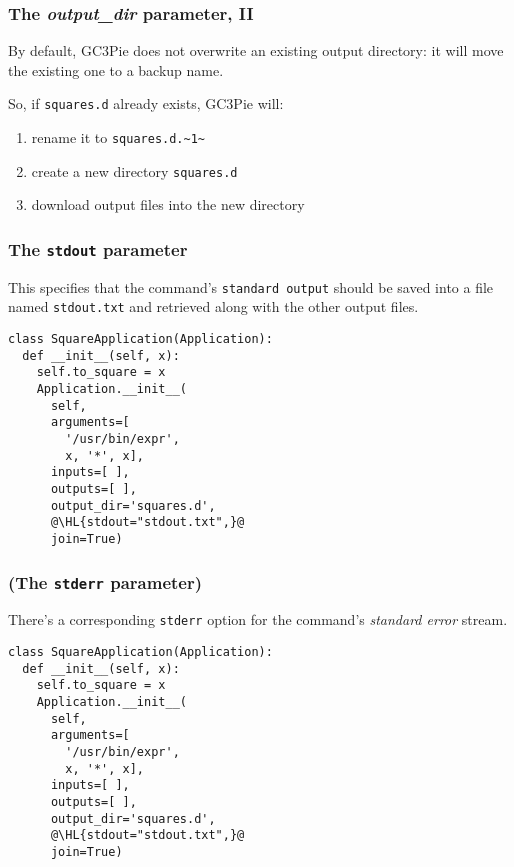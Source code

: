 \documentclass[english,serif,mathserif,xcolor=pdftex,dvipsnames,table]{beamer}
\begin{document}
\begin{frame}[fragile]
  \frametitle{The \emph{output\_dir} parameter, II}

  By default, GC3Pie does not overwrite an existing output directory:
  it will move the existing one to a backup name.

  \+
  So, if \texttt{squares.d} already exists, GC3Pie will:
  \begin{enumerate}
  \item rename it to \lstinline|squares.d.~1~|
  \item create a new directory \texttt{squares.d}
  \item download output files into the new directory
  \end{enumerate}
\end{frame}


\begin{frame}[fragile]
\frametitle{The \texttt{stdout} parameter}

This specifies that the command's \texttt{standard output} should be
saved into a file named \texttt{stdout.txt} and retrieved along with
the other output files.

  \+
\begin{lstlisting}
class SquareApplication(Application):
  def __init__(self, x):
    self.to_square = x
    Application.__init__(
      self,
      arguments=[
        '/usr/bin/expr',
        x, '*', x],
      inputs=[ ],
      outputs=[ ],
      output_dir='squares.d',
      @\HL{stdout="stdout.txt",}@
      join=True)
\end{lstlisting}
\end{frame}


\begin{frame}[fragile]
\frametitle{(The \texttt{stderr} parameter)}

There's a corresponding \texttt{stderr} option for the command's
\emph{standard error} stream.

  \+
\begin{lstlisting}
class SquareApplication(Application):
  def __init__(self, x):
    self.to_square = x
    Application.__init__(
      self,
      arguments=[
        '/usr/bin/expr',
        x, '*', x],
      inputs=[ ],
      outputs=[ ],
      output_dir='squares.d',
      @\HL{stdout="stdout.txt",}@
      join=True)
\end{lstlisting}
\end{frame}
\end{document}
